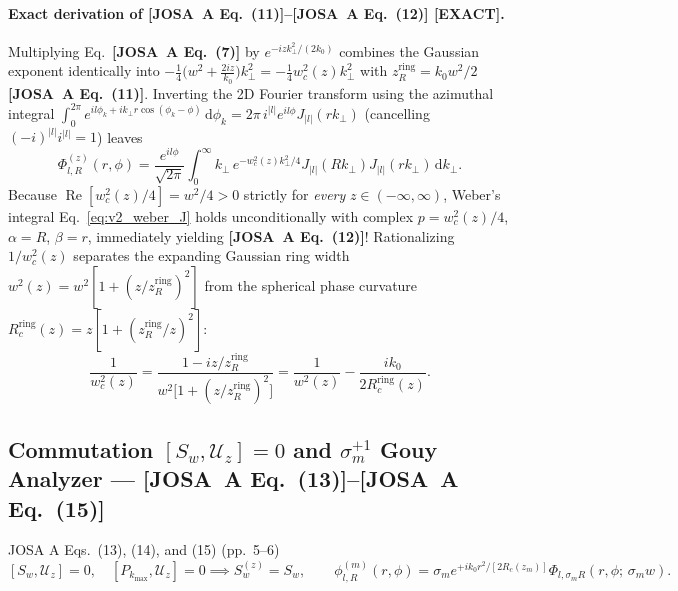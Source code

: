 \documentclass[10pt,letterpaper]{article}
\newcommand{\abs}[1]{\lvert #1 \rvert}
\newcommand{\dd}{\mathrm{d}}
\newcommand{\josa}[1]{\textbf{[JOSA~A Eq.~(#1)]}}
\newcommand{\tagexact}{\textcolor{forest}{\textbf{[EXACT]}}}
\numberwithin{equation}{section}
\begin{document}
\paragraph*{Exact derivation of \josa{11}--\josa{12} \tagexact{}.}
Multiplying Eq.~\josa{7} by $e^{-iz k_\perp^2/(2k_0)}$ combines the Gaussian exponent identically into $-\frac{1}{4}\bigl(w^2 + \frac{2iz}{k_0}\bigr)k_\perp^2 = -\frac{1}{4} w_c^2(z) k_\perp^2$ with $z_R^{\mathrm{ring}} = k_0 w^2/2$ \josa{11}. Inverting the 2D Fourier transform using the azimuthal integral $\int_0^{2\pi} e^{il\phi_k + i k_\perp r\cos(\phi_k-\phi)}\,\dd\phi_k = 2\pi\,i^{\abs{l}} e^{il\phi} J_{\abs{l}}(r k_\perp)$ (cancelling $(-i)^{\abs{l}} i^{\abs{l}} = 1$) leaves
\begin{equation}
  \Phi_{l,R}^{(z)}(r,\phi) = \frac{e^{il\phi}}{\sqrt{2\pi}}\int_0^\infty k_\perp\,e^{-w_c^2(z)k_\perp^2/4} J_{\abs{l}}(R k_\perp) J_{\abs{l}}(r k_\perp)\,\dd k_\perp.
\end{equation}
Because $\operatorname{Re}[w_c^2(z)/4] = w^2/4 > 0$ strictly for \emph{every} $z \in (-\infty,\infty)$, Weber's integral Eq.~\eqref{eq:v2_weber_J} holds unconditionally with complex $p = w_c^2(z)/4$, $\alpha = R$, $\beta = r$, immediately yielding \josa{12}! Rationalizing $1/w_c^2(z)$ separates the expanding Gaussian ring width $w^2(z) = w^2[1+(z/z_R^{\mathrm{ring}})^2]$ from the spherical phase curvature $R_c^{\mathrm{ring}}(z) = z[1+(z_R^{\mathrm{ring}}/z)^2]$:
\begin{equation}
  \frac{1}{w_c^2(z)} = \frac{1 - iz/z_R^{\mathrm{ring}}}{w^2\bigl[1 + (z/z_R^{\mathrm{ring}})^2\bigr]} = \frac{1}{w^2(z)} - \frac{i k_0}{2 R_c^{\mathrm{ring}}(z)}.
\end{equation}

\subsection{Commutation $[S_w, \mathcal{U}_z] = 0$ and $\sigma_m^{+1}$ Gouy Analyzer --- \josa{13}--\josa{15}}

\begin{targeteq}{JOSA A Eqs.~(13), (14), and (15) (pp.~5--6)}
\[
  [S_w, \mathcal{U}_z] = 0, \quad [P_{k_{\max}}, \mathcal{U}_z] = 0 \implies S_w^{(z)} = S_w, \qquad
  \phi_{l,R}^{(m)}(r,\phi) = \sigma_m e^{+ik_0 r^2/[2R_c(z_m)]}\Phi_{l,\sigma_m R}(r,\phi;\,\sigma_m w).
\]
\end{targeteq}
\end{document}
